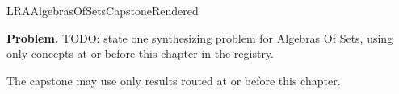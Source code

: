\ifcsname LRAAlgebrasOfSetsCapstoneRendered\endcsname
\else
\expandafter\gdef\csname LRAAlgebrasOfSetsCapstoneRendered\endcsname{}

\newpage
{}
\label{cap:algebras-of-sets}

\begin{tcolorbox}[
  colback=gray!6,
  colframe=gray!40,
  arc=2pt,
  left=8pt, right=8pt, top=6pt, bottom=6pt,
  title={\small\textbf{Capstone Problem}},
  fonttitle=\small\bfseries
]
\textbf{Problem.}
TODO: state one synthesizing problem for Algebras Of Sets, using only concepts at or
before this chapter in the registry.
\end{tcolorbox}

\begin{remark*}
The capstone may use only results routed at or before this chapter.
\end{remark*}

\clearpage
\fi
